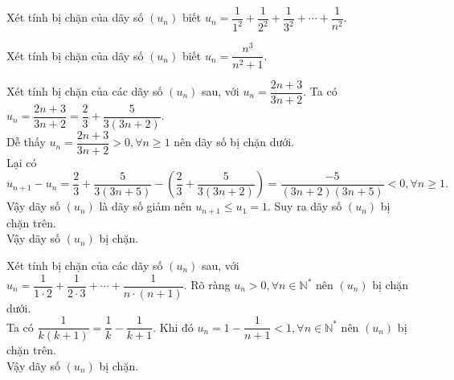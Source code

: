 \begin{ex}%
	 Xét tính bị chặn của dãy số $(u_n)$ biết $u_n=\dfrac{1}{1^2}+\dfrac{1}{2^2}+\dfrac{1}{3^2}+\cdots+\dfrac{1}{n^2}$.
\end{ex}

\begin{ex}%
	Xét tính bị chặn  của dãy số $(u_n)$ biết $u_n=\dfrac{n^3}{n^2+1}$.
\end{ex}

\begin{bt}%
	Xét tính bị chặn của các dãy số $(u_n)$ sau, với $u_n=\dfrac{2n+3}{3n+2}$.
	\loigiai
	{
		Ta có $u_n=\dfrac{2n+3}{3n+2}=\dfrac{2}{3}+\dfrac{5}{3(3n+2)}$.\\
		Dễ thấy $u_n=\dfrac{2n+3}{3n+2}>0, \forall n \geq 1$ nên dãy số bị chặn dưới.\\
		Lại có
		\[u_{n+1}-u_n=\dfrac{2}{3}+\dfrac{5}{3(3n+5)}-\left( \dfrac{2}{3}+\dfrac{5}{3(3n+2)} \right)=\dfrac{-5}{(3n+2)(3n+5)}<0, \forall n \geq 1.\]
		Vậy dãy số $(u_n)$ là dãy số giảm nên $u_{n+1}\leq u_1=1$. Suy ra dãy số $(u_n)$ bị chặn trên.\\
		Vậy dãy số $(u_n)$ bị chặn.
	}
\end{bt}

\begin{bt}%
	Xét tính bị chặn của các dãy số $(u_n)$ sau, với $u_n=\dfrac{1}{1\cdot 2}+\dfrac{1}{2\cdot 3}+\cdots+\dfrac{1}{n\cdot (n+1)}$.
	\loigiai
	{
		Rõ ràng $u_n>0, \forall n \in \mathbb{N}^*$ nên $(u_n)$ bị chặn dưới.\\
		Ta có $\dfrac{1}{k(k+1)}=\dfrac{1}{k}-\dfrac{1}{k+1}$. Khi đó   $u_n=1-\dfrac{1}{n+1}<1, \forall n \in \mathbb{N}^*$ nên $(u_n)$ bị chặn trên.\\ Vậy dãy số $(u_n)$ bị chặn.	
	}
\end{bt}


